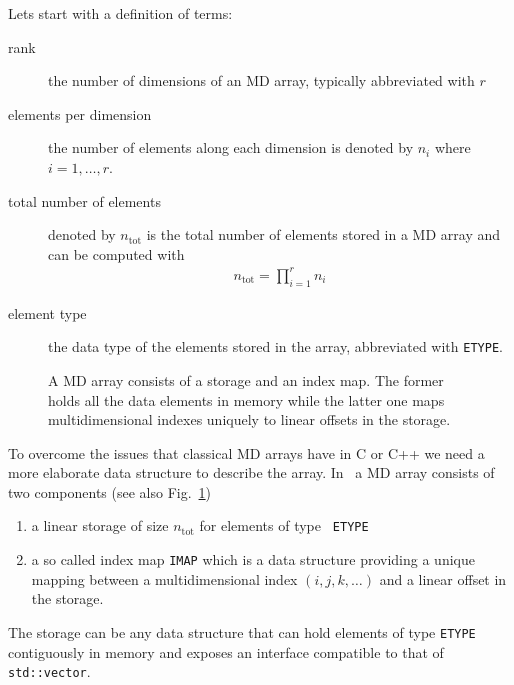 Lets start with a definition of terms:
\begin{description}
\item[rank] the number of dimensions of an MD array, typically abbreviated with
$r$
\item[elements per dimension] the number of elements along each dimension is
denoted by $n_i$ where $i=1,\hdots,r$.
\item[total number of elements] denoted by $n_{\mathrm{tot}}$ is the total
number of elements stored in a MD array and can be computed with 
\begin{align}
    n_{\mathrm{tot}} = \prod_{i=1}^r n_i
\end{align}
\item[element type] the data type of the elements stored in the array,
abbreviated with \texttt{ETYPE}. 
\end{description}

\begin{figure}[tb]
\centering
\begin{minipage}[c]{0.55\linewidth}
\centering
{}
\end{minipage}
\hfill
\begin{minipage}[c]{0.39\linewidth}
\caption{{\small\label{fig:array_app:basic_structure} A MD array consists of a
storage and an index map. The former holds all the data elements in memory while
the latter one maps multidimensional indexes uniquely to linear offsets in the
storage.
}}
\end{minipage}
\end{figure}
To overcome the issues that classical MD arrays have in C or C++ we need a more
elaborate data structure to describe the array. In \libpnicore\ a MD array
consists of two components (see also Fig.~\ref{fig:array_app:basic_structure})
\begin{enumerate}
\item a linear storage of size $n_{\mathrm{tot}}$ for elements of type \texttt{
ETYPE}
\item a so called index map \texttt{IMAP} which is a data structure providing a
unique mapping between a multidimensional index $(i,j,k,\hdots)$ and a linear
offset in the storage. 
\end{enumerate}
The storage can be any data structure that can hold elements of type \texttt{ETYPE}
contiguously in memory and exposes an interface compatible to that of \texttt{std::vector}.

